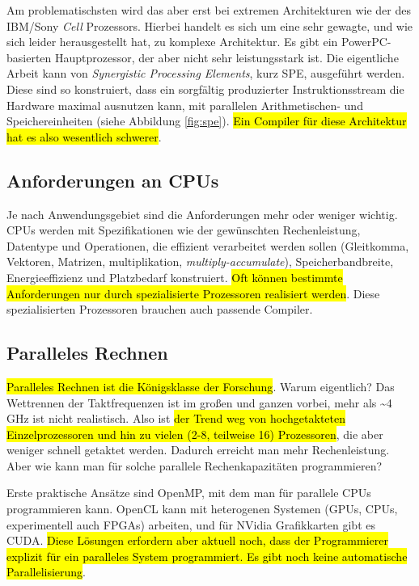 \documentclass[ngerman,abstract=true]{scrartcl}
\begin{document}
Am problematischsten wird das aber erst bei extremen Architekturen wie der des IBM/Sony \emph{Cell} Prozessors. Hierbei handelt es sich um eine sehr gewagte, und wie sich leider herausgestellt hat, zu komplexe Architektur. Es gibt ein PowerPC-basierten Hauptprozessor, der aber nicht sehr leistungsstark ist. Die eigentliche Arbeit kann von \emph{Synergistic Processing Elements}, kurz SPE, ausgeführt werden. Diese sind so konstruiert, dass ein sorgfältig produzierter Instruktionsstream die Hardware maximal ausnutzen kann, mit parallelen Arithmetischen- und Speichereinheiten (siehe Abbildung \ref{fig:spe}). \hl{Ein Compiler für diese Architektur hat es also wesentlich schwerer}.

\subsection{Anforderungen an CPUs}

Je nach Anwendungsgebiet sind die Anforderungen mehr oder weniger wichtig. CPUs werden mit Spezifikationen wie der gewünschten Rechenleistung, Datentype und Operationen, die effizient verarbeitet werden sollen (Gleitkomma, Vektoren, Matrizen, multiplikation, \emph{multiply-accumulate}), Speicherbandbreite, Energieeffizienz und Platzbedarf konstruiert. \hl{Oft können bestimmte Anforderungen nur durch spezialisierte Prozessoren realisiert werden}. Diese spezialisierten Prozessoren brauchen auch passende Compiler.

\subsection{Paralleles Rechnen}

\hl{Paralleles Rechnen ist die Königsklasse der Forschung}. Warum eigentlich? Das Wettrennen der Taktfrequenzen ist im großen und ganzen vorbei, mehr als \textasciitilde4\,GHz ist nicht realistisch. Also ist \hl{der Trend weg von hochgetakteten Einzelprozessoren und hin zu vielen (2-8, teilweise 16) Prozessoren}, die aber weniger schnell getaktet werden. Dadurch erreicht man mehr Rechenleistung. Aber wie kann man für solche parallele Rechenkapazitäten programmieren?

Erste praktische Ansätze sind OpenMP, mit dem man für parallele CPUs programmieren kann. {OpenCL} kann mit heterogenen Systemen (GPUs, CPUs, experimentell auch FPGAs) arbeiten, und für NVidia Grafikkarten gibt es CUDA. \hl{Diese Lösungen erfordern aber aktuell noch, dass der Programmierer explizit für ein paralleles System programmiert. Es gibt noch keine automatische Parallelisierung}.
\end{document}
